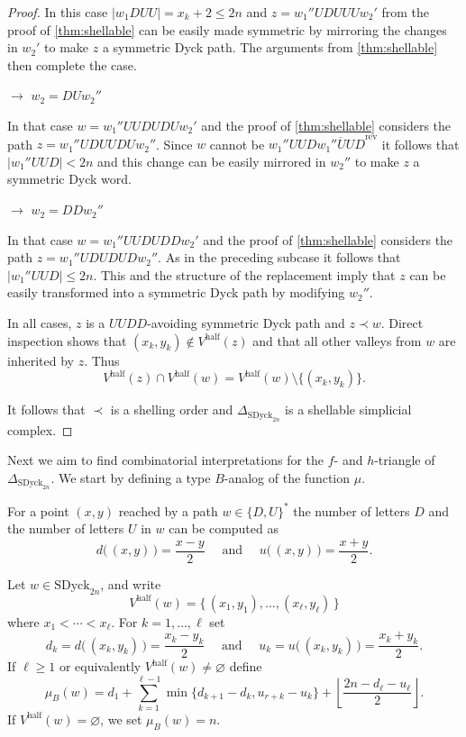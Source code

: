 \documentclass[11pt]{amsart}
\def\half{\mathrm{half}}
\def\SDyck{\mathrm{SDyck}}
\def\rev{\mathrm{rev}}
\theoremstyle{plain}
\numberwithin{lemma}{\DefaultNumberTheoremWithin}
\numberwithin{theorem}{\DefaultNumberTheoremWithin}
\numberwithin{corollary}{\DefaultNumberTheoremWithin}
\numberwithin{proposition}{\DefaultNumberTheoremWithin}
\numberwithin{conjecture}{\DefaultNumberTheoremWithin}
\theoremstyle{definition}
\numberwithin{definition}{\DefaultNumberTheoremWithin}
\numberwithin{question}{\DefaultNumberTheoremWithin}
\numberwithin{problem}{\DefaultNumberTheoremWithin}
\theoremstyle{remark}
\numberwithin{remark}{\DefaultNumberTheoremWithin}
\numberwithin{example}{\DefaultNumberTheoremWithin}
\numberwithin{claim}{\DefaultNumberTheoremWithin}
\begin{document}
\begin{proof}
    In this case $|w_1DUU| = x_k+2 \leq 2n$ and 
    $z = w_1''UDUUUw_2'$ from the proof of \ref{thm:shellable} 
    can be easily made symmetric by mirroring the
    changes in $w_2'$ to make $z$ a symmetric Dyck path. The 
    arguments from \ref{thm:shellable} then complete the case.

    \medskip

    $\rightarrow$ $w_2 = DUw_2''$

    In that case $w = w_1''UUDUDUw_2'$ and the proof of 
    \ref{thm:shellable} considers the path $z = w_1''UDUUDUw_2''$.
    Since $w$ cannot be $w_1''UUD\overline{w_1''UUD}^{\rev}$
    it follows that $|w_1''UUD| < 2n$ and this change can be easily mirrored in $w_2''$
    to make $z$ a symmetric Dyck word. 

    \medskip

    $\rightarrow$ $w_2 = DDw_2''$
    
    In that case $w = w_1''UUDUDDw_2'$ and the proof of 
    \ref{thm:shellable} considers the path $z=w_1''UDUDUDw_2''$. 
    As in the preceding subcase it follows that  $|w_1''UUD| \leq 2n$. This and the structure of the replacement 
    imply that $z$ can be easily transformed into a symmetric Dyck path by 
    modifying $w_2''$. 

In all cases, $z$ is a $UUDD$-avoiding symmetric Dyck path
and $z \prec w$. 
Direct inspection shows that $(x_k,y_k) \not\in V^ {\half}(z)$ 
and that all
other valleys from $w$ are inherited by $z$. 
Thus 
\[
V^{\half}(z)\cap V^{\half}(w)
 =
V^{\half}(w)\setminus\{ (x_k,y_k)\}.
\]

It follows that $\prec$ is a shelling order and $\Delta_{\SDyck_{2n}}$ is
a shellable simplicial complex.
\end{proof}


Next we aim to find combinatorial interpretations for the $f$- and
$h$-triangle of $\Delta_{\SDyck_{2n}}$. We start by defining a
type $B$-analog of the function $\mu$. 

For a point $(x,y)$ reached by a path $w \in \{D,U\}^ *$ the number of 
letters $D$ and the number of letters $U$ in $w$ can be computed as 
\[
d\big(\,(x,y)\,\big)=\frac{x-y}{2}
\quad \text{ and } \quad
u\big(\,(x,y)\,\big)=\frac{x+y}{2}.
\]

Let $w\in\SDyck_{2n}$, and write
\[
V^{\half}(w)=\big\{\,(x_1,y_1) , \ldots , (x_\ell,y_\ell)\,\big\}
\]
where $x_1<\cdots<x_\ell$. For $k = 1,\ldots, \ell$ set
\[
d_k=d\big(\,(x_k,y_k)\,\big)= \frac{x_k-y_k}{2} 
\quad \text{ and } \quad
u_k=u\big(\,(x_k,y_k)\,\big) = \frac{x_k+y_k}{2}.
\]
If $\ell \geq1$ or equivalently $V^ {\half}(w) \neq \varnothing$  
define
\[
\mu_B(w)
=
d_1+
\sum_{k=1}^{\ell-1}
\min\{d_{k+1}-d_k,u_{r+k}-u_k\}
+
\left\lfloor
\frac{2n-d_\ell-u_\ell}{2}
\right\rfloor.
\tag{5.1}
\]
If $V^{\half}(w)=\varnothing$, we set
$\mu_B(w)=n.$
\end{document}
